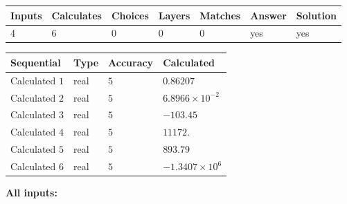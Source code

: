 \documentclass[12pt]{article}
\begin{document}
   
\noindent\begin{tabular}{|l|l|l|l|l|l|l|}
 \hline
Inputs & Calculates & Choices & Layers & Matches & Answer & Solution \\ \hline
           4  & 
           6  & 
           0
  & 
           0  & 
           0  & 
  yes & 
  yes 
  \\ \hline
 \end{tabular}
   
   
   
   
\noindent{}
   
   
  
  
\noindent\begin{tabular}{|l|l|l|l|}
\hline
 Sequential & Type & Accuracy & Calculated \\ 
\hline
 
 
  Calculated $            1 $ & real & $            5  $ & 
 $ 0.86207 $ 
 \\  \hline  
 
 
  Calculated $            2 $ & real & $            5  $ & 
 $ 6.8966 \times 10^{-2} $ 
 \\  \hline  
 
 
  Calculated $            3 $ & real & $            5  $ & 
 $ -103.45 $ 
 \\  \hline  
 
 
  Calculated $            4 $ & real & $            5  $ & 
 $ 11172. $ 
 \\  \hline  
 
 
  Calculated $            5 $ & real & $            5  $ & 
 $ 893.79 $ 
 \\  \hline  
 
 
  Calculated $            6 $ & real & $            5  $ & 
 $ -1.3407 \times 10^{6} $ 
 \\  \hline  
 \end{tabular}
   
   
   
   
\noindent\vspace{0.1in}\hspace{-0.08in} {\textbf{\Large{All inputs: }}}
   
   
  
\end{document}
